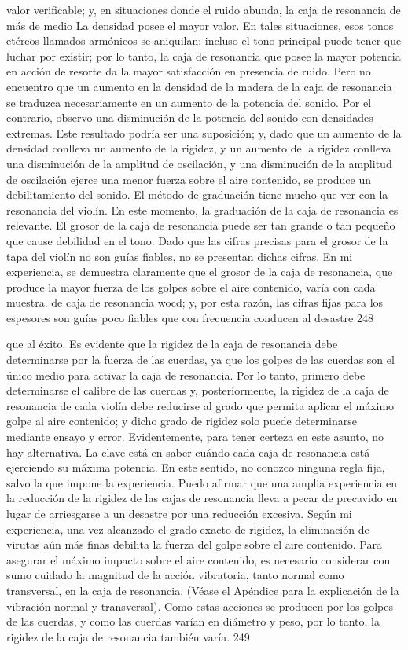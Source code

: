 valor verificable; y, en situaciones donde el ruido
abunda, la caja de resonancia de más de medio
La densidad posee el mayor valor. En tales situaciones, esos tonos etéreos llamados armónicos se aniquilan; incluso el tono principal puede tener que luchar por existir; por lo tanto, la caja de resonancia que posee la mayor potencia en acción de resorte da la mayor satisfacción en presencia de
ruido.
Pero no encuentro que un aumento en la densidad de la madera de la caja de resonancia se traduzca necesariamente en un aumento de la potencia del sonido. Por el contrario, observo una disminución de la potencia del sonido con densidades extremas. Este resultado podría ser una suposición; y, dado que un aumento de la densidad conlleva un aumento de la rigidez, y un aumento de la rigidez conlleva una disminución de la amplitud de oscilación, y una disminución de la amplitud de oscilación ejerce una menor fuerza sobre el aire contenido, se produce un debilitamiento del sonido.
El método de graduación tiene mucho que ver con la resonancia del violín. En este momento, la graduación de la caja de resonancia es relevante. El grosor de la caja de resonancia puede ser tan grande o tan pequeño que cause debilidad en el tono. Dado que las cifras precisas para el grosor de la tapa del violín no son guías fiables, no se presentan dichas cifras. En mi experiencia, se demuestra claramente que el grosor de la caja de resonancia, que produce la mayor fuerza de los golpes sobre el aire contenido, varía con cada muestra.
de caja de resonancia wocd; y, por esta razón, las cifras fijas para los espesores son guías poco fiables que con frecuencia conducen al desastre 248

que al éxito. Es evidente que la rigidez de la caja de resonancia debe determinarse por la fuerza de las cuerdas, ya que los golpes de las cuerdas son el único medio para activar la caja de resonancia. Por lo tanto, primero debe determinarse el calibre de las cuerdas y, posteriormente, la rigidez de la caja de resonancia de cada violín debe reducirse al grado que permita aplicar el máximo golpe al aire contenido; y dicho grado de rigidez solo puede determinarse mediante ensayo y error. Evidentemente, para tener certeza en este asunto, no hay alternativa.
La clave está en saber cuándo cada caja de resonancia está ejerciendo su máxima potencia. En este sentido, no conozco ninguna regla fija, salvo la que impone la experiencia. Puedo afirmar que una amplia experiencia en la reducción de la rigidez de las cajas de resonancia lleva a pecar de precavido en lugar de arriesgarse a un desastre por una reducción excesiva. Según mi experiencia, una vez alcanzado el grado exacto de rigidez, la eliminación de virutas aún más finas debilita la fuerza del golpe sobre el aire contenido.
Para asegurar el máximo impacto sobre el aire contenido, es necesario considerar con sumo cuidado la magnitud de la acción vibratoria, tanto normal como transversal, en la caja de resonancia.
(Véase el Apéndice para la explicación de la vibración normal y transversal).
Como estas acciones se producen por los golpes de las cuerdas, y como las cuerdas varían en diámetro y peso, por lo tanto, la rigidez de la caja de resonancia también varía.
249

